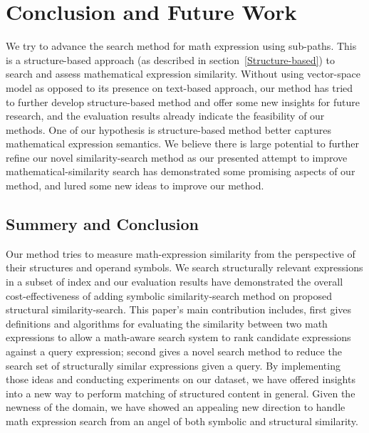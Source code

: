 \chapter{Conclusion and Future Work}
We try to advance the search method for math expression using sub-paths.
This is a structure-based approach (as described in section~\ref{Structure-based}) to search and assess mathematical expression similarity.
Without using vector-space model as opposed to its presence on text-based approach, our method has tried to further develop structure-based method and offer some new insights for future research, 
and the evaluation results already indicate the feasibility of our methods.
One of our hypothesis is structure-based method better captures mathematical expression semantics. 
We believe there is large potential to further refine our novel similarity-search method as our presented attempt to improve mathematical-similarity search has demonstrated some promising aspects of our method, and lured some new ideas to improve our method.

\section{Summery and Conclusion}
Our method tries to measure math-expression similarity from the perspective of their structures and operand symbols. 
We search structurally relevant expressions in a subset of index and our evaluation results have demonstrated the overall cost-effectiveness of adding symbolic similarity-search method on proposed structural similarity-search.
This paper's main contribution includes, 
first gives definitions and algorithms for evaluating the similarity between two math expressions to allow a math-aware search system to rank candidate expressions against a query expression;
second gives a novel search method to reduce the search set of structurally similar expressions given a query. 
By implementing those ideas and conducting experiments on our dataset, we have offered insights into a new way to perform matching of structured content in general.
Given the newness of the domain, we have showed an appealing new direction to handle math expression search from an angel of both symbolic and structural similarity. 

